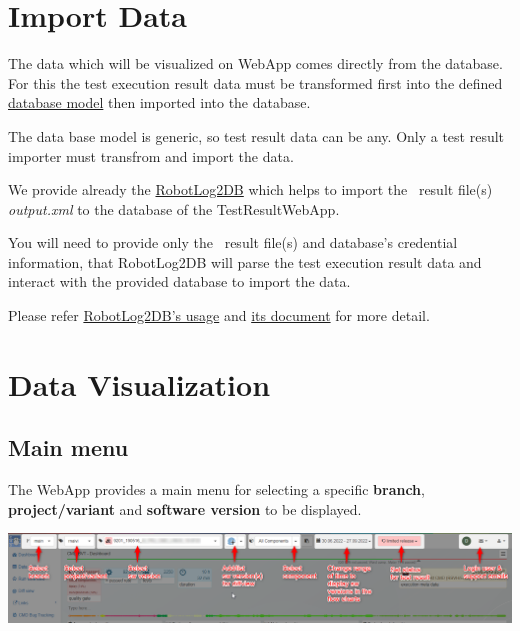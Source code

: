 \hypertarget{import-data}{%
\section{Import Data}\label{import-data}}

The data which will be visualized on WebApp comes directly from the database.
For this the test execution result data must be transformed first 
into the defined \href{https://github.com/test-fullautomation/testresultwebapp/blob/develop/TestResultWebApp/mysql_server/datamodel/datamodel.svg}{database model} 
then imported into the database.

The data base model is generic, so test result data can be any. Only a test 
result importer must transfrom and import the data.

We provide already the \href{https://github.com/test-fullautomation/robotframework-robotlog2db}{RobotLog2DB}
which helps to import the \rfwcore\ result file(s) \emph{output.xml} to the 
database of the TestResultWebApp.

You will need to provide only the \rfwcore\ result file(s) and database's 
credential information, that RobotLog2DB will parse the test execution result data 
and interact with the provided database to import the data.

Please refer \href{https://github.com/test-fullautomation/robotframework-robotlog2db#usage}{RobotLog2DB's usage} and 
\href{https://github.com/test-fullautomation/robotframework-robotlog2db/blob/develop/RobotLog2DB/RobotLog2DB.pdf}
{its document} for more detail.


\hypertarget{data-visualization}{%
\section{Data Visualization}\label{data-visualization}}

\hypertarget{main-menu}{%
\subsection{Main menu}\label{main-menu}}
The WebApp provides a main menu for selecting a specific \textbf{branch}, 
\textbf{project/variant} and \textbf{software version} to be displayed.

\includegraphics[width=1\linewidth]{./pictures/main-menu.png}

